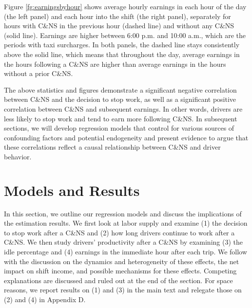 \documentclass[reviewmode]{restat}
\begin{document}
Figure \ref{fg:earningsbyhour} shows average hourly earnings in each hour of the day (the left panel) and
each hour into the shift (the right panel), separately for hours with C\&NS in the previous hour 
(dashed line) and without any C\&NS (solid line). Earnings are higher between 6:00 p.m. and 10:00 a.m.,
which are the periods with taxi surcharges. In both panels, the dashed line stays consistently 
above the solid line, which means that throughout the day, average earnings in the hours following a 
C\&NS are higher than  average earnings in the hours without a prior C\&NS.

The above statistics and figures demonstrate a significant negative correlation between C\&NS and the 
decision to stop work, as well as a significant positive correlation between C\&NS and subsequent earnings.
In other words, drivers are less likely to stop work and tend to earn more following C\&NS. In subsequent
sections, we will develop regression models  that control for various sources of confounding factors and
potential endogeneity and present evidence to argue that these correlations reflect a causal relationship
between C\&NS and driver behavior.

\section{Models and Results}
\label{sec:main}


In this section, we outline our regression models and discuss the implications of the estimation results.
We first look at labor supply and examine (1) the decision to stop work after a C\&NS and (2) how long drivers
continue to work after a C\&NS. We then study drivers' productivity after a C\&NS by examining (3) the idle
percentage and (4) earnings in the immediate hour after each trip. We follow with the discussion on the dynamics and heterogeneity
of these effects, the net impact on shift income, and possible mechanisms for these effects. 
Competing explanations are discussed and ruled out at the end of the section. For space reasons, we report
results on (1) and (3) in the main text and relegate those on (2) and (4) in Appendix D. 
\end{document}
